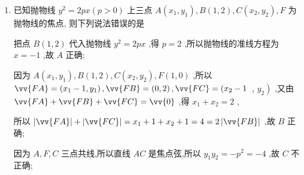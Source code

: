 \begin{enumerate}
\begin{jieda}
        对于选项 $B$,由抛物线焦点弦的性质可知, ${B}$ 正确；
        
        对于选项 ${C}$ ,因为 $F\left( {1,0}\right)$ ,所以 $\left| {PM}\right|  + \left| {P{P}_{1}}\right|  = \left| {PM}\right|  + \left| {PF}\right|  \geq  \left| {MF}\right|  = \sqrt{2}$ ,故 ${C}$ 正确;
        
        对于选项 ${D}$ ,显然直线 $x = 0,y = 1$ 与抛物线只有一个公共点,设过 $M$ 的直线方程为 $y = {kx}$  $+ 1\left( {k \neq  0}\right)$ ,
        
        联立 $\left\{  \begin{array}{l} y = {kx} + 1, \\  {y}^{2} = {4x}, \end{array}\right.$ 可得 ${k}^{2}{x}^{2} + \left( {{2k} - 4}\right) x + 1 = 0$ ,令 $\Delta  = 0$ ,得 $k = 1$ ,所以直线 $y = x + 1$ 与抛物线也只有一个公共点,此时有三条直线符合题意,故 ${D}$ 错误.

    \end{jieda}
    
    \item 已知抛物线 ${y}^{2} = {2px}\left( {p > 0}\right)$ 上三点 $A\left( {{x}_{1},{y}_{1}}\right) ,B\left( {1,2}\right) ,C\left( {{x}_{2},{y}_{2}}\right) ,F$ 为抛物线的焦点, 则下列说法错误的是
    \begin{jieda}
        把点 $B\left( {1,2}\right)$ 代入抛物线 ${y}^{2} = {2px}$ ,得 $p = 2$ ,所以抛物线的准线方程为 $x =  - 1$ ,故 ${A}$ 正确;
        
        因为 $A\left( {{x}_{1},{y}_{1}}\right) ,B\left( {1,2}\right) ,C\left( {{x}_{2},{y}_{2}}\right) ,F\left( {1,0}\right)$ ,所以 $\vv{FA} = \left( {{x}_{1} - 1,{y}_{1}}\right) ,\vv{FB} = \left( {0,2}\right) ,\vv{FC} = \left( {{x}_{2} - 1}\right.$ , $\left. {y}_{2}\right)$ ,又由 $\vv{FA} + \vv{FB} + \vv{FC} = \vv{0}$ ,得 ${x}_{1} + {x}_{2} = 2$ ,
        
        所以 $\left| \vv{FA}\right|  + \left| \vv{FC}\right|  = {x}_{1} + 1 + {x}_{2} + 1 = 4 = 2\left| \vv{FB}\right|$ ,故 ${B}$ 正确;
        
        因为 $A,F,C$ 三点共线,所以直线 ${AC}$ 是焦点弦,所以 ${y}_{1}{y}_{2} =  - {p}^{2} =  - 4$ ,故 ${C}$ 不正确; 
        

\end{jieda}
\end{enumerate}

